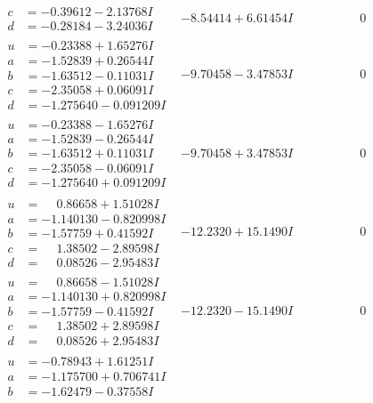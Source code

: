\documentclass[1p]{elsarticle_modified}
\theoremstyle{definition}
\begin{document}
$$\begin{array}{c|c|c}
\begin{aligned}
c &= -0.39612 - 2.13768 I \\
d &= -0.28184 - 3.24036 I\end{aligned}
 & -8.54414 + 6.61454 I & \phantom{-0.000000 } 0 \\ \hline\begin{aligned}
u &= -0.23388 + 1.65276 I \\
a &= -1.52839 + 0.26544 I \\
b &= -1.63512 - 0.11031 I \\
c &= -2.35058 + 0.06091 I \\
d &= -1.275640 - 0.091209 I\end{aligned}
 & -9.70458 - 3.47853 I & \phantom{-0.000000 } 0 \\ \hline\begin{aligned}
u &= -0.23388 - 1.65276 I \\
a &= -1.52839 - 0.26544 I \\
b &= -1.63512 + 0.11031 I \\
c &= -2.35058 - 0.06091 I \\
d &= -1.275640 + 0.091209 I\end{aligned}
 & -9.70458 + 3.47853 I & \phantom{-0.000000 } 0 \\ \hline\begin{aligned}
u &= \phantom{-}0.86658 + 1.51028 I \\
a &= -1.140130 - 0.820998 I \\
b &= -1.57759 + 0.41592 I \\
c &= \phantom{-}1.38502 - 2.89598 I \\
d &= \phantom{-}0.08526 - 2.95483 I\end{aligned}
 & -12.2320 + 15.1490 I & \phantom{-0.000000 } 0 \\ \hline\begin{aligned}
u &= \phantom{-}0.86658 - 1.51028 I \\
a &= -1.140130 + 0.820998 I \\
b &= -1.57759 - 0.41592 I \\
c &= \phantom{-}1.38502 + 2.89598 I \\
d &= \phantom{-}0.08526 + 2.95483 I\end{aligned}
 & -12.2320 - 15.1490 I & \phantom{-0.000000 } 0 \\ \hline\begin{aligned}
u &= -0.78943 + 1.61251 I \\
a &= -1.175700 + 0.706741 I \\
b &= -1.62479 - 0.37558 I \\

\end{aligned}
\end{array}$$
\end{document}
